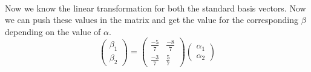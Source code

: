 \documentclass[a4paper,12pt,reqno,oneside]{amsart}
\theoremstyle{plain}
\numberwithin{equation}{section}
\begin{document}
\\
Now we know the linear transformation for both the standard basis vectors. Now we can push these values in the matrix and get the value for the corresponding $\beta$ depending on the value of $\alpha$.
$$
\begin{pmatrix}
    \beta_1 \\
    \beta_2
\end{pmatrix} = \begin{pmatrix}
    \frac{-5}{7} & \frac{-8}{7} \\
    \frac{-3}{7} & \frac{5}{7}
\end{pmatrix} \begin{pmatrix}
    \alpha_1 \\
    \alpha_2
\end{pmatrix}
$$





\end{document}

